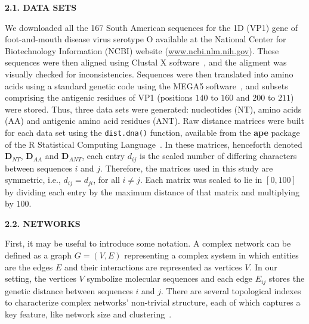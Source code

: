 \documentclass[12pt]{article}
\begin{document}
\bigskip
\bigskip

\textbf{2.1. DATA SETS}

\bigskip
\bigskip

We downloaded all the 167 South American sequences for the 1D (VP1) gene of foot-and-mouth disease virus serotype O available at the National Center for Biotechnology Information (NCBI) website (\url{www.ncbi.nlm.nih.gov}).
These sequences were then aligned using Clustal X software~\cite{clustal}, and the aligment was visually checked for inconsistencies. Sequences were then translated into amino acids using a standard genetic code using the MEGA5 software~\cite{MEGA}, and subsets comprising the antigenic residues of VP1 (positions $140$ to $160$ and $200$ to $211$)~\cite{antigenic} were stored.
Thus, three data sets were generated: nucleotides (NT), amino acids (AA) and antigenic amino acid residues (ANT).
Raw distance matrices were built for each data set using the \verb|dist.dna()| function, available from the \textbf{ape} package of the R Statistical Computing Language~\cite{R}.
In these matrices, henceforth denoted $\mathbf{D}_{NT}$, $\mathbf{D}_{AA}$ and $\mathbf{D}_{ANT}$, each entry $d_{ij}$ is the scaled number of differing characters between sequences $i$ and $j$.
Therefore, the matrices used in this study are symmetric, i.e., $d_{ij} = d_{ji}$, for all $i \neq j$.
Each matrix was scaled to lie in $[0,100]$ by dividing each entry by the maximum distance of that matrix and multiplying by $100$.
 
\bigskip
\bigskip

\textbf{2.2. NETWORKS}

\bigskip
\bigskip

First, it may be useful to introduce some notation.
A complex network can be defined as a graph $G=(V,E)$ representing a complex system in which entities are the edges $E$ and their interactions are represented as vertices $V$.
In our setting, the vertices $V$ symbolize molecular sequences and each edge $E_{ij}$ stores the genetic distance between sequences $i$ and $j$.
There are several topological indexes to characterize  complex networks' non-trivial structure, each of which captures a key feature, like network size and clustering~\cite{Barabasi2004}.
\end{document}
